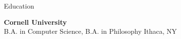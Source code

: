
\begin{rSection}{Education}

	{\bf \large{Cornell University}} \hfill \color{darkgray}{2021 - 2025}
	\\ 
	B.A. in Computer Science, B.A. in Philosophy \hfill Ithaca, NY

\end{rSection}